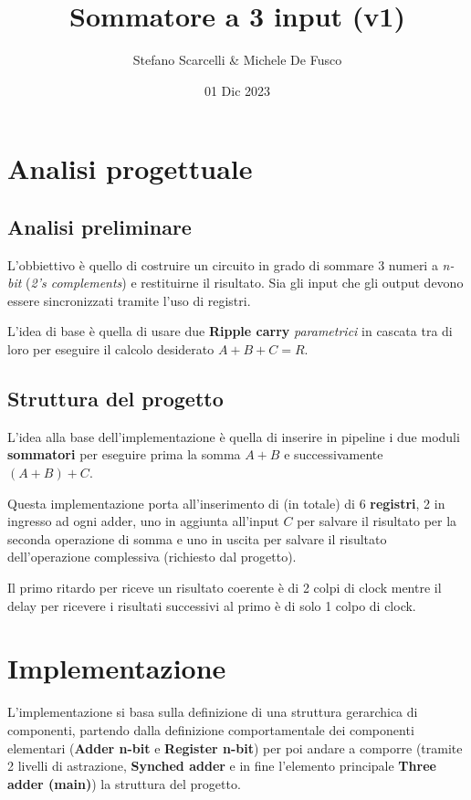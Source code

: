 \documentclass[12pt]{article}
\title{Sommatore a 3 input (v1)}
\author{Stefano Scarcelli \& Michele De Fusco}
\date{01 Dic 2023}
\begin{document}
\maketitle
\newpage

\tableofcontents
\newpage


\section{Analisi progettuale}
    \subsection{Analisi preliminare}
        L'obbiettivo è quello di costruire un circuito in grado di sommare 3 numeri a \textit{n-bit} (\textit{2's complements}) e restituirne il risultato. Sia gli input che gli output devono essere sincronizzati tramite l'uso di registri.

        L'idea di base è quella di usare due \textbf{Ripple carry} \textit{parametrici} in cascata tra di loro per eseguire il calcolo desiderato $A+B+C=R$.
    
    \subsection{Struttura del progetto}
        L'idea alla base dell'implementazione è quella di inserire in pipeline i due moduli \textbf{sommatori} per eseguire prima la somma $A+B$ e successivamente $(A+B)+C$.

        Questa implementazione porta all'inserimento di (in totale) di 6 \textbf{registri}, 2 in ingresso ad ogni adder, uno in aggiunta all'input $C$ per salvare il risultato per la seconda operazione di somma e uno in uscita per salvare il risultato dell'operazione complessiva (richiesto dal progetto).

        Il primo ritardo per riceve un risultato coerente è di 2 colpi di clock mentre il delay per ricevere i risultati successivi al primo è di solo 1 colpo di clock.

\section{Implementazione}
    L'implementazione si basa sulla definizione di una struttura gerarchica di componenti, partendo dalla definizione comportamentale dei componenti elementari (\textbf{Adder n-bit} e \textbf{Register n-bit}) per poi andare a comporre (tramite 2 livelli di astrazione, \textbf{Synched adder} e in fine l'elemento principale \textbf{Three adder (main)}) la struttura del progetto.
\end{document}
